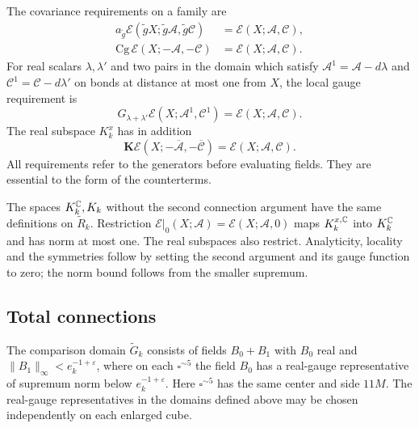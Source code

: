 The covariance requirements on a family are
\begin{equation}\label{eq:rg-activity-symmetries}
 \begin{split}
 a_{\tilde g}\mathscr E(\tilde gX;\tilde g\mathscr A,
                                      \tilde g\mathscr C)
                                  &=\mathscr E(X;\mathscr A,\mathscr C),\\
 \mathrm{Cg}\,\mathscr E(X;-\mathscr A,-\mathscr C)
                                  &=\mathscr E(X;\mathscr A,\mathscr C).
 \end{split}
\end{equation}
For real scalars $\lambda,\lambda'$ and two pairs in the domain
which satisfy $\mathscr A^1=\mathscr A-d\lambda$ and
$\mathscr C^1=\mathscr C-d\lambda'$ on bonds at distance at
most one from $X$, the local gauge requirement is
\[
 G_{\lambda+\lambda'}\mathscr E(X;\mathscr A^1,\mathscr C^1)
                               =\mathscr E(X;\mathscr A,\mathscr C).
\]
The real subspace $K_k^x$ has in addition
\[
 \mathbf K\mathscr E(X;-\overline{\mathscr A},-\overline{\mathscr C})
                               =\mathscr E(X;\mathscr A,\mathscr C).
\]
All requirements refer to the generators before evaluating fields.
They are essential to the form of the counterterms.

The spaces $K_k^\mathbb C,K_k$ without the second connection argument
have the same definitions on $\widetilde R_k$. Restriction
$\mathscr E|_0(X;\mathscr A)=\mathscr E(X;\mathscr A,0)$ maps
$K_k^{x,\mathbb C}$ into $K_k^\mathbb C$ and has norm at most one. The real
subspaces also restrict. Analyticity, locality and the symmetries
follow by setting the second argument and its gauge function to
zero; the norm bound follows from the smaller supremum.

\subsection{Total connections}
\label{subsec:rg-total-connection-domain}

The comparison domain $\widetilde G_k$ consists of fields $B_0+B_1$
with $B_0$ real and $\|B_1\|_\infty<e_k^{-1+\varepsilon}$,
where on each $\square^{\sim5}$ the field $B_0$ has a real-gauge
representative of supremum norm below $e_k^{-1+\varepsilon}$.
Here $\square^{\sim5}$ has the same center and side $11M$.
The real-gauge representatives in the domains defined above may
be chosen independently on each enlarged cube.

